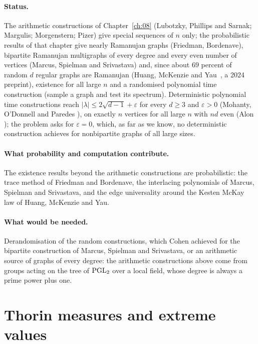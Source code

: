 \paragraph{Status.} The arithmetic constructions of Chapter~\ref{ch:08} (Lubotzky, Phillips and Sarnak; Margulis; Morgenstern; Pizer) give special sequences of $n$ only; the probabilistic results of that chapter give nearly Ramanujan graphs (Friedman, Bordenave), bipartite Ramanujan multigraphs of every degree and every even number of vertices (Marcus, Spielman and Srivastava) and, since about $69$ percent of random $d$ regular graphs are Ramanujan (Huang, McKenzie and Yau~\cite{hmy2024}, a 2024 preprint), existence for all large $n$ and a randomised polynomial time construction (sample a graph and test its spectrum). Deterministic polynomial time constructions reach $|\lambda|\le2\sqrt{d-1}+\varepsilon$ for every $d\ge3$ and $\varepsilon>0$ (Mohanty, O'Donnell and Paredes \cite{mop2022}), on exactly $n$ vertices for all large $n$ with $nd$ even (Alon \cite{alon2021}); the problem asks for $\varepsilon=0$, which, as far as we know, no deterministic construction achieves for nonbipartite graphs of all large sizes.

\paragraph{What probability and computation contribute.} The existence results beyond the arithmetic constructions are probabilistic: the trace method of Friedman and Bordenave, the interlacing polynomials of Marcus, Spielman and Srivastava, and the edge universality around the Kesten McKay law of Huang, McKenzie and Yau.

\paragraph{What would be needed.} Derandomisation of the random constructions, which Cohen \cite{cohen2016} achieved for the bipartite construction of Marcus, Spielman and Srivastava, or an arithmetic source of graphs of every degree: the arithmetic constructions above come from groups acting on the tree of $\mathrm{PGL}_2$ over a local field, whose degree is always a prime power plus one.

\section{Thorin measures and extreme values}

